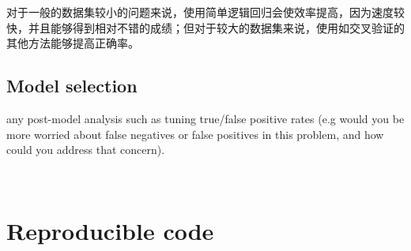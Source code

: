 \documentclass{article}
\begin{document}
对于一般的数据集较小的问题来说，使用简单逻辑回归会使效率提高，因为速度较快，并且能够得到相对不错的成绩；但对于较大的数据集来说，使用如交叉验证的其他方法能够提高正确率。


\subsection{Model selection}
any post-model analysis such as tuning true/false positive rates (e.g would you be more worried about false negatives or false positives in this problem, and how could you address that concern).






\ 

\section{Reproducible code}


\end{document}
